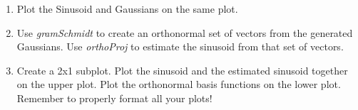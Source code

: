 \documentclass[11pt]{article}
\begin{document}
\begin{enumerate}[a.]
\begin{enumerate}
    \item Plot the Sinusoid and Gaussians on the same plot.

    \item Use \emph{gramSchmidt} to create an orthonormal set of vectors from the generated Gaussians.
    Use \emph{orthoProj} to estimate the sinusoid from that set of vectors.

    \item Create a 2x1 subplot.
    Plot the sinusoid and the estimated sinusoid together on the upper plot.
    Plot the orthonormal basis functions on the lower plot.
    Remember to properly format all your plots!
    \end{enumerate}

\end{enumerate}
\end{document}
